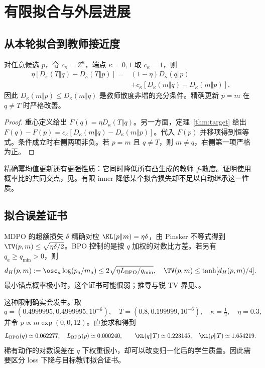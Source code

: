 \chapter{有限拟合与外层进展}
\label{ch:finite}
\section{从本轮拟合到教师接近度}
\begin{theorem}[重心进展恒等式]
\label{thm:progress}
对任意候选 $p$，令 $c_\kappa=Z^\kappa$，端点 $\kappa=0,1$ 取 $c_\kappa=1$，则
\begin{align}
\eta[D_\kappa(T\Vert q)-D_\kappa(T\Vert p)]
={}&(1-\eta)D_\kappa(q\Vert p)\nonumber\\
&+c_\kappa[D_\kappa(m\Vert q)-D_\kappa(m\Vert p)].
\label{eq:progress}
\end{align}
因此 $D_\kappa(m\Vert p)\le D_\kappa(m\Vert q)$ 是教师散度非增的充分条件。精确更新 $p=m$ 在 $q\ne T$ 时严格改善。
\end{theorem}
\begin{proof}
重心定义给出 $F(q)=\eta D_\kappa(T\Vert q)$。另一方面，定理~\ref{thm:target} 给出 $F(q)-F(p)=c_\kappa[D_\kappa(m\Vert q)-D_\kappa(m\Vert p)]$。代入 $F(p)$ 并移项得到恒等式。条件成立时右侧两项非负。若 $p=m$ 且 $q\ne T$，则 $m\ne q$，右侧第一项严格为正。
\end{proof}

精确幂均值更新还有更强性质：它同时降低所有凸生成的教师 $f$-散度。证明使用概率比的共同交点，见。有限 inner 降低某个拟合损失却不足以自动继承这一性质。

\section{拟合误差证书}
MDPO 的超额损失 $\delta$ 精确对应 $\KL(p\Vert m)=\eta\delta$，由 Pinsker 不等式得到 $\TV(p,m)\le\sqrt{\eta\delta/2}$。BPO 控制的是按 $q$ 加权的对数比方差。若另有 $q_a\ge q_{\min}>0$，则
\begin{equation}
d_H(p,m):=\osc_a\log(p_a/m_a)
\le2\sqrt{\eta L_{\rm BPO}/q_{\min}},
\quad
\TV(p,m)\le\tanh[d_H(p,m)/4].
\label{eq:bpo-certificate-main}
\end{equation}
最小锚点概率极小时，这个证书可能很弱；推导与锐 TV 界见、。

这种限制确实会发生。取
\begin{equation}
q=(0.4999995,0.4999995,10^{-6}),\quad
T=(0.8,0.199999,10^{-6}),\quad
\kappa=\tfrac12,\quad\eta=0.3,
\end{equation}
并令 $p\propto m\exp(0,0,12)$。直接求和得到
\begin{equation}
L_{\rm BPO}(q)\simeq0.062277,\quad L_{\rm BPO}(p)\simeq0.000240,
\qquad
\KL(q\Vert T)\simeq0.223145,\quad\KL(p\Vert T)\simeq1.654219.
\end{equation}
稀有动作的对数误差在 $q$ 下权重很小，却可以改变归一化后的学生质量。因此需要区分 loss 下降与目标教师拟合证书。

